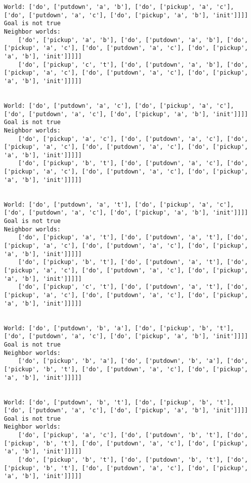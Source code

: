\documentclass[11pt]{article}
\begin{document}
\begin{Verbatim}[commandchars=\\\{\}]
World: ['do', ['putdown', 'a', 'b'], ['do', ['pickup', 'a', 'c'], ['do', ['putdown', 'a', 'c'], ['do', ['pickup', 'a', 'b'], 'init']]]]
Goal is not true
Neighbor worlds:
    ['do', ['pickup', 'a', 'b'], ['do', ['putdown', 'a', 'b'], ['do', ['pickup', 'a', 'c'], ['do', ['putdown', 'a', 'c'], ['do', ['pickup', 'a', 'b'], 'init']]]]]
    ['do', ['pickup', 'c', 't'], ['do', ['putdown', 'a', 'b'], ['do', ['pickup', 'a', 'c'], ['do', ['putdown', 'a', 'c'], ['do', ['pickup', 'a', 'b'], 'init']]]]]


World: ['do', ['putdown', 'a', 'c'], ['do', ['pickup', 'a', 'c'], ['do', ['putdown', 'a', 'c'], ['do', ['pickup', 'a', 'b'], 'init']]]]
Goal is not true
Neighbor worlds:
    ['do', ['pickup', 'a', 'c'], ['do', ['putdown', 'a', 'c'], ['do', ['pickup', 'a', 'c'], ['do', ['putdown', 'a', 'c'], ['do', ['pickup', 'a', 'b'], 'init']]]]]
    ['do', ['pickup', 'b', 't'], ['do', ['putdown', 'a', 'c'], ['do', ['pickup', 'a', 'c'], ['do', ['putdown', 'a', 'c'], ['do', ['pickup', 'a', 'b'], 'init']]]]]


World: ['do', ['putdown', 'a', 't'], ['do', ['pickup', 'a', 'c'], ['do', ['putdown', 'a', 'c'], ['do', ['pickup', 'a', 'b'], 'init']]]]
Goal is not true
Neighbor worlds:
    ['do', ['pickup', 'a', 't'], ['do', ['putdown', 'a', 't'], ['do', ['pickup', 'a', 'c'], ['do', ['putdown', 'a', 'c'], ['do', ['pickup', 'a', 'b'], 'init']]]]]
    ['do', ['pickup', 'b', 't'], ['do', ['putdown', 'a', 't'], ['do', ['pickup', 'a', 'c'], ['do', ['putdown', 'a', 'c'], ['do', ['pickup', 'a', 'b'], 'init']]]]]
    ['do', ['pickup', 'c', 't'], ['do', ['putdown', 'a', 't'], ['do', ['pickup', 'a', 'c'], ['do', ['putdown', 'a', 'c'], ['do', ['pickup', 'a', 'b'], 'init']]]]]


World: ['do', ['putdown', 'b', 'a'], ['do', ['pickup', 'b', 't'], ['do', ['putdown', 'a', 'c'], ['do', ['pickup', 'a', 'b'], 'init']]]]
Goal is not true
Neighbor worlds:
    ['do', ['pickup', 'b', 'a'], ['do', ['putdown', 'b', 'a'], ['do', ['pickup', 'b', 't'], ['do', ['putdown', 'a', 'c'], ['do', ['pickup', 'a', 'b'], 'init']]]]]


World: ['do', ['putdown', 'b', 't'], ['do', ['pickup', 'b', 't'], ['do', ['putdown', 'a', 'c'], ['do', ['pickup', 'a', 'b'], 'init']]]]
Goal is not true
Neighbor worlds:
    ['do', ['pickup', 'a', 'c'], ['do', ['putdown', 'b', 't'], ['do', ['pickup', 'b', 't'], ['do', ['putdown', 'a', 'c'], ['do', ['pickup', 'a', 'b'], 'init']]]]]
    ['do', ['pickup', 'b', 't'], ['do', ['putdown', 'b', 't'], ['do', ['pickup', 'b', 't'], ['do', ['putdown', 'a', 'c'], ['do', ['pickup', 'a', 'b'], 'init']]]]]



\end{Verbatim}
\end{document}
